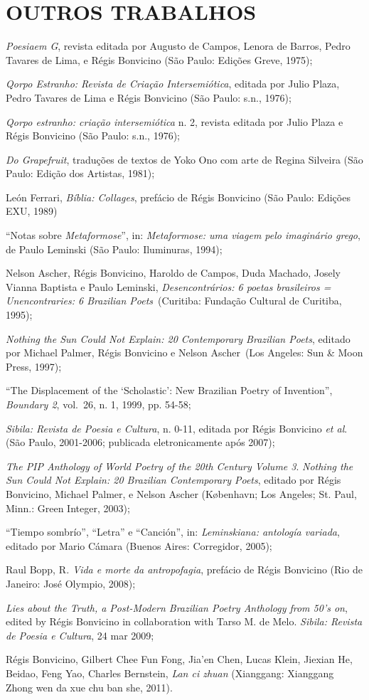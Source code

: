 \section{OUTROS TRABALHOS}

\begin{Parskip}
\emph{Poesiaem G}, revista editada por Augusto de Campos, Lenora de
Barros, Pedro Tavares de Lima, e Régis Bonvicino (São Paulo: Edições
Greve, 1975);

\emph{Qorpo Estranho: Revista de Criação Intersemiótica}, editada por
Julio Plaza, Pedro Tavares de Lima e Régis Bonvicino (São Paulo: s.n.,
1976);

\emph{Qorpo estranho: criação intersemiótica} n. 2, revista editada por
Julio Plaza e Régis Bonvicino (São Paulo: s.n., 1976);

\emph{Do Grapefruit}, traduções de textos de Yoko Ono com arte de Regina
Silveira (São Paulo: Edição dos Artistas, 1981);

León Ferrari, \emph{Bíblia: Collages}, prefácio de Régis Bonvicino (São
Paulo: Edições EXU, 1989)

``Notas sobre \emph{Metaformose}'', in: \emph{Metaformose: uma viagem
pelo imaginário grego}, de Paulo Leminski (São Paulo: Iluminuras, 1994);

Nelson Ascher, Régis Bonvicino, Haroldo de Campos, Duda Machado, Josely
Vianna Baptista e Paulo Leminski, \emph{Desencontrários: 6 poetas
brasileiros = Unencontraries: 6 Brazilian Poets}~(Curitiba: Fundação
Cultural de Curitiba, 1995);

\emph{Nothing the Sun Could Not Explain: 20 Contemporary Brazilian
Poets}, editado por Michael Palmer, Régis Bonvicino e Nelson Ascher~(Los
Angeles: Sun \& Moon Press, 1997);

``The Displacement of the `Scholastic': New Brazilian Poetry of
Invention'', \emph{Boundary 2}, vol.~26, n. 1, 1999, pp. 54-58;

\emph{Sibila: Revista de Poesia e Cultura}, n. 0-11, editada por Régis
Bonvicino \emph{et al}. (São Paulo, 2001-2006; publicada eletronicamente
após 2007);

\emph{The PIP Anthology of World Poetry of the 20th Century Volume 3}.
\emph{Nothing the Sun Could Not Explain: 20 Brazilian Contemporary
Poets}, editado por Régis Bonvicino, Michael Palmer, e Nelson Ascher
(København; Los Angeles; St. Paul, Minn.: Green Integer, 2003);

``Tiempo sombrío'', ``Letra'' e ``Canción'', in: \emph{Leminskiana:
antología variada}, editado por Mario Cámara (Buenos Aires: Corregidor,
2005);

Raul Bopp, R\emph{. Vida e morte da antropofagia}, prefácio de Régis
Bonvicino (Rio de Janeiro: José Olympio, 2008);

\emph{Lies about the Truth, a Post-Modern Brazilian Poetry Anthology
from 50's on}, edited by Régis Bonvicino in collaboration with Tarso M.
de Melo. \emph{Sibila: Revista de Poesia e Cultura}, 24 mar 2009;

Régis Bonvicino, Gilbert Chee Fun Fong, Jia'en Chen, Lucas Klein,
Jiexian He, Beidao, Feng Yao, Charles Bernstein, \emph{Lan ci zhuan}
(Xianggang: Xianggang Zhong wen da xue chu ban she, 2011).
\end{Parskip}